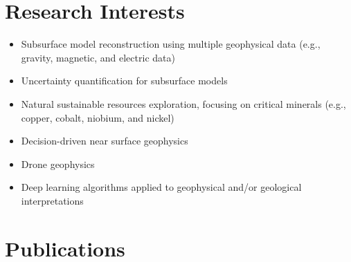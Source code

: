 \documentclass[11pt, a4paper]{article}
\begin{document}
\section*{Research Interests}
\begin{itemize}
	
	\item Subsurface model reconstruction using multiple geophysical data (e.g., gravity, magnetic, and electric data)
	\item Uncertainty quantification for subsurface models
	\item Natural sustainable resources exploration, focusing on critical minerals (e.g., copper, cobalt, niobium, and nickel)
	\item Decision-driven near surface geophysics
	\item Drone geophysics
	\item Deep learning algorithms applied to geophysical and/or geological interpretations
	
\end{itemize}





\section*{Publications}
\end{document}
